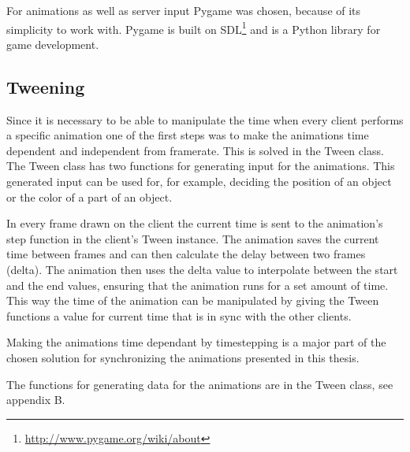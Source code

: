 For animations as well as server input Pygame was chosen, because of its simplicity to work with. Pygame is built on SDL\footnote{\url{http://www.pygame.org/wiki/about}} and is a Python library for game development.

\subsection{Tweening}

Since it is necessary to be able to manipulate the time when every client performs a specific animation one of the first steps was to make the animations time dependent and independent from framerate. This is solved in the Tween class. The Tween class has two functions for generating input for the animations. This generated input can be used for, for example, deciding the position of an object or the color of a part of an object. 

In every frame drawn on the client the current time is sent to the animation's step function in the client's Tween instance. The animation saves the current time between frames and can then calculate the delay between two frames (delta). The animation then uses the delta value to interpolate between the start and the end values, ensuring that the animation runs for a set amount of time. This way the time of the animation can be manipulated by giving the Tween functions a value for current time that is in sync with the other clients. 

Making the animations time dependant by timestepping is a major part of the chosen solution for synchronizing the animations presented in this thesis. 

The functions for generating data for the animations are in the Tween class, see appendix B.  




